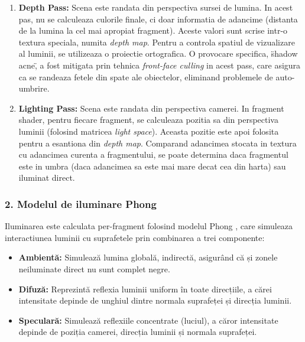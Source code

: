 \documentclass[11pt,a4paper]{article}
\begin{document}
\begin{enumerate}
    \item \textbf{Depth Pass:} Scena este randata din perspectiva sursei de lumina. In acest pas, nu se calculeaza culorile finale, ci doar informatia de adancime (distanta de la lumina la cel mai apropiat fragment). Aceste valori sunt scrise intr-o textura speciala, numita \textit{depth map}. Pentru a controla spatiul de vizualizare al luminii, se utilizeaza o proiectie ortografica. O provocare specifica, \"shadow acne\", a fost mitigata prin tehnica \textit{front-face culling} in acest pass, care asigura ca se randeaza fetele din spate ale obiectelor, eliminand problemele de auto-umbrire.
    
    \item \textbf{Lighting Pass:} Scena este randata din perspectiva camerei. In fragment shader, pentru fiecare fragment, se calculeaza pozitia sa din perspectiva luminii (folosind matricea \textit{light space}). Aceasta pozitie este apoi folosita pentru a esantiona din \textit{depth map}. Comparand adancimea stocata in textura cu adancimea curenta a fragmentului, se poate determina daca fragmentul este in umbra (daca adancimea sa este mai mare decat cea din harta) sau iluminat direct.
\end{enumerate}

\subsubsection{2. Modelul de iluminare Phong}
Iluminarea este calculata per-fragment folosind modelul Phong \cite{lab7}, care simuleaza interactiunea luminii cu suprafetele prin combinarea a trei componente:

\begin{itemize}
    \item \textbf{Ambientă:} Simulează lumina globală, indirectă, asigurând că și zonele neiluminate direct nu sunt complet negre.
    \item \textbf{Difuză:} Reprezintă reflexia luminii uniform în toate direcțiile, a cărei intensitate depinde de unghiul dintre normala suprafeței și direcția luminii.
    \item \textbf{Speculară:} Simulează reflexiile concentrate (luciul), a căror intensitate depinde de poziția camerei, direcția luminii și normala suprafeței.
\end{itemize}
\end{document}

